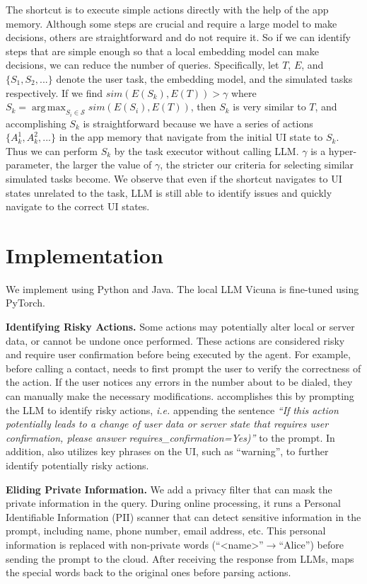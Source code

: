 The shortcut is to execute simple actions directly with the help of the app memory. Although some steps are crucial and require a large model to make decisions, others are straightforward and do not require it. So if we can identify steps that are simple enough so that a local embedding model \cite{instructor-xl} can make decisions, we can reduce the number of queries. Specifically, let $T$, $E$, and $\{S_1, S_2, ...\}$ denote the user task, the embedding model, and the simulated tasks respectively. If we find $sim({E}(S_k), {E}(T))>\gamma$ where 
$S_k=\operatorname*{arg\, max}_{S_i \in \mathcal{S}} sim({E}(S_i), {E}(T))$, 
then $S_k$ is very similar to $T$, and accomplishing $S_k$ is straightforward because we have a series of actions $\{A_k^1, A_k^2, ...\}$ in the app memory that navigate from the initial UI state to $S_k$. Thus we can perform $S_k$ by the task executor without calling LLM. 
$\gamma$ is a hyper-parameter, the larger the value of $\gamma$, the stricter our criteria for selecting similar simulated tasks become.
We observe that even if the shortcut navigates to UI states unrelated to the task, LLM is still able to identify issues and quickly navigate to the correct UI states.
\section{Implementation}
\label{sec:implementation}

We implement \name using Python and Java.  
The local LLM Vicuna \cite{vicuna2023} is fine-tuned using PyTorch.

\textbf{Identifying Risky Actions.}
Some actions may potentially alter local or server data, or cannot be undone once performed. These actions are considered risky and require user confirmation before being executed by the agent.
For example, before calling a contact, \name needs to first prompt the user to verify the correctness of the action. If the user notices any errors in the number about to be dialed, they can manually make the necessary modifications.
\name accomplishes this by prompting the LLM to identify risky actions, \textit{i.e.} appending the sentence \textit{``If this action potentially leads to a change of user data or server state that requires user confirmation, please answer requires\_confirmation=Yes)''} to the prompt.
In addition, \name also utilizes key phrases on the UI, such as ``warning'', to further identify potentially risky actions.

\textbf{Eliding Private Information.}
We add a privacy filter that can mask the private information in the query. During online processing, it runs a Personal Identifiable Information (PII) scanner \cite{pii_detector} that can detect sensitive information in the prompt, including name, phone number, email address, etc. This personal information is replaced with non-private words (\eg ``<name>''$\rightarrow$``Alice'') before sending the prompt to the cloud. After receiving the response from LLMs, \name maps the special words back to the original ones before parsing actions.
\label{sec:benchmark}

